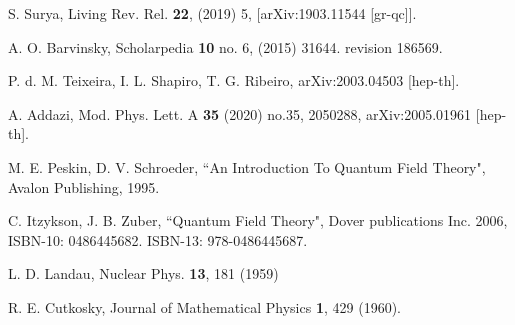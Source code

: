 \documentclass[a4paper,11pt]{article}
\begin{document}
\begin{thebibliography}{99}
 S. Surya,  Living Rev. Rel. {\bf 22}, (2019) 5, [arXiv:1903.11544 [gr-qc]].




 A. O. Barvinsky,  Scholarpedia {\bf 10} no. 6, (2015) 31644. revision 186569.


 P. d. M. Teixeira, I. L. Shapiro, T. G. Ribeiro,  arXiv:2003.04503 [hep-th].


 A. Addazi, Mod. Phys. Lett. A {\bf 35} (2020) no.35, 2050288, arXiv:2005.01961 [hep-th].








 M. E. Peskin, D. V. Schroeder, ``An Introduction To Quantum Field Theory", Avalon Publishing, 1995.



 C. Itzykson, J. B. Zuber, ``Quantum Field Theory",
Dover publications Inc. 2006, ISBN-10: 0486445682. ISBN-13:
978-0486445687.









 L. D. Landau, %
Nuclear Phys. {\bf 13}, 181 (1959)



 R. E. Cutkosky, %
Journal of Mathematical Physics {\bf 1}, 429 (1960).


	
	
	
	

	
	
	
	
	

	
	
	
	
	
	
	

	
	

\end{thebibliography}
\end{document}
